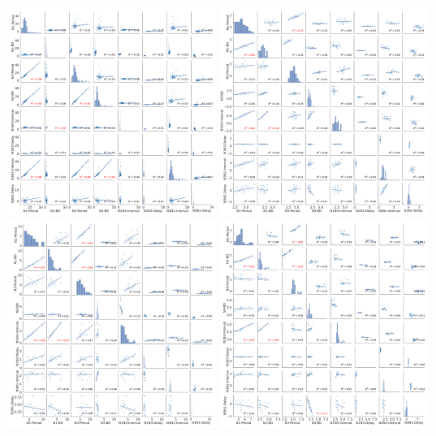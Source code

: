 \begin{figure}[htbp]
	\centering
	\includegraphics[width=0.49\textwidth]{./img/invariants/data/SUSSEX/prep2/images/2phases/output_pairplot_reset.pdf}
	\includegraphics[width=0.49\textwidth]{./img/invariants/data/SUSSEX/SO_driven/images/output_pairplot_reset.pdf}
	\includegraphics[width=0.49\textwidth]{./img/invariants/data/SUSSEX/MLN_driven/images/output_pairplot_reset.pdf}
	\includegraphics[width=0.49\textwidth]{./img/invariants/data/SUSSEX/CV1a_driven1/images/2phases/output_pairplot_reset.pdf}

\end{figure}
